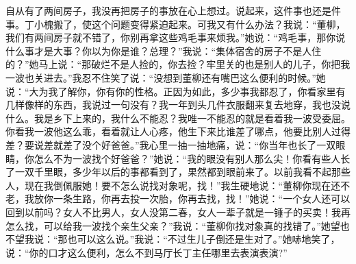 \documentclass[12pt,oneside]{book}
\begin{document}
自从有了两间房子，我没再把房子的事放在心上想过。说起来，这件事也还是件事。丁小槐搬了，使这个问题变得紧迫起来。可我又有什么办法？我说：``董柳，我们有两间房子就不错了，你别再拿这些鸡毛事来烦我。''她说：``鸡毛事，那你说什么事才是大事？你以为你是谁？总理？''我说：``集体宿舍的房子不是人住的？''她马上说：``那破烂不是人捡的，你去捡？牢里关的也是别人的儿子，你把我一波也关进去。''我忍不住笑了说：``没想到董柳还有嘴巴这么便利的时候。''她说：``大为我了解你，你有你的性格。正因为如此，多少事我都忍了，你看家里有几样像样的东西，我说过一句没有？我一年到头几件衣服翻来复去地穿，我也没说什么。我是乡下上来的，我什么不能忍？我唯一不能忍的就是看着我一波受委屈。你看我一波他这么乖，看着就让人心疼，他生下来比谁差了哪点，他要比别人过得差？要说差就差了没个好爸爸。''我心里一抽一抽地痛，说：``你当年也长了一双眼睛，你怎么不为一波找个好爸爸？''她说：``我的眼没有别人那么尖！你看有些人长了一双千里眼，多少年以后的事都看到了，果然都到眼前来了。以前我看不起那些人，现在我倒佩服她！要不怎么说找对象呢，找！''我生硬地说：``董柳你现在还不老，我放你一条生路，你再去投一次胎，你再去找，找！''她说：``一个女人还可以回到以前吗？女人不比男人，女人没第二春，女人一辈子就是一锤子的买卖！我再怎么找，可以给我一波找个亲生父亲？''我说：``董柳你找对象真的找错了。''她望也不望我说：``那也可以这么说。''我说：``不过生儿子倒还是生对了。''她哧地笑了，说：``你的口才这么便利，怎么不到马厅长丁主任哪里去表演表演?''
\end{document}

